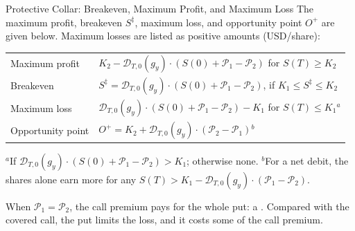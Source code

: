 \documentclass[aspectratio=169,11pt]{beamer}
\newcommand{\Dc}{\mathcal{D}}
\newcommand{\Pc}{\mathcal{P}}
\begin{document}
\begin{frame}{Protective Collar: Breakeven, Maximum Profit, and Maximum Loss}
  The maximum profit, breakeven $S^{\ddagger}$, maximum loss, and opportunity
  point $O^{+}$ are given below. Maximum losses are listed as positive amounts (USD/share):
  \begin{center}\small
    \begin{tabular}{ll}
      \toprule
      Maximum profit & $K_{2}-\Dc_{T,0}(g_{y})\cdot\left(S(0)+\Pc_{1}-\Pc_{2}\right)$ for $S(T)\geq K_{2}$ \\
      Breakeven & $S^{\ddagger}=\Dc_{T,0}(g_{y})\cdot\left(S(0)+\Pc_{1}-\Pc_{2}\right)$, if $K_{1}\leq S^{\ddagger}\leq K_{2}$ \\
      Maximum loss & $\Dc_{T,0}(g_{y})\cdot\left(S(0)+\Pc_{1}-\Pc_{2}\right)-K_{1}$ for $S(T)\leq K_{1}$${}^{a}$ \\
      Opportunity point & $O^{+}=K_{2}+\Dc_{T,0}(g_{y})\cdot\left(\Pc_{2}-\Pc_{1}\right)$${}^{b}$ \\
      \bottomrule
    \end{tabular}
  \end{center}
  {\footnotesize ${}^{a}$If $\Dc_{T,0}(g_{y})\cdot\left(S(0)+\Pc_{1}-\Pc_{2}\right)>K_{1}$; otherwise none.
  ${}^{b}$For a net debit, the shares alone earn more for any $S(T)>K_{1}-\Dc_{T,0}(g_{y})\cdot\left(\Pc_{1}-\Pc_{2}\right)$.\par}
  \vspace{0.3em}
  When $\Pc_{1}=\Pc_{2}$, the call premium pays for the whole put: a
  . Compared with the covered call, the put limits the
  loss, and it costs some of the call premium.
\end{frame}
\end{document}

